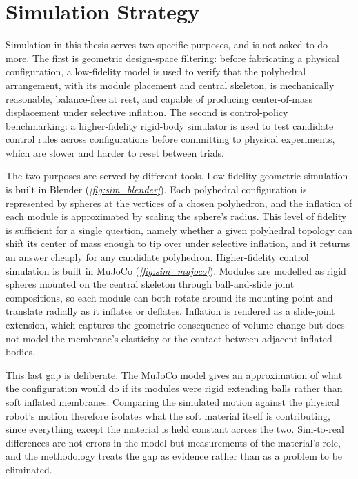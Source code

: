 \section{Simulation Strategy}
\label{sec:simulation-strategy}

Simulation in this thesis serves two specific purposes, and is not asked to do more. The first is geometric design-space filtering: before fabricating a physical configuration, a low-fidelity model is used to verify that the polyhedral arrangement, with its module placement and central skeleton, is mechanically reasonable, balance-free at rest, and capable of producing center-of-mass displacement under selective inflation. The second is control-policy benchmarking: a higher-fidelity rigid-body simulator is used to test candidate control rules across configurations before committing to physical experiments, which are slower and harder to reset between trials.

The two purposes are served by different tools. Low-fidelity geometric simulation is built in Blender (\textit{\cref{fig:sim_blender}}). Each polyhedral configuration is represented by spheres at the vertices of a chosen polyhedron, and the inflation of each module is approximated by scaling the sphere's radius. This level of fidelity is sufficient for a single question, namely whether a given polyhedral topology can shift its center of mass enough to tip over under selective inflation, and it returns an answer cheaply for any candidate polyhedron. Higher-fidelity control simulation is built in MuJoCo (\textit{\cref{fig:sim_mujoco}}). Modules are modelled as rigid spheres mounted on the central skeleton through ball-and-slide joint compositions, so each module can both rotate around its mounting point and translate radially as it inflates or deflates. Inflation is rendered as a slide-joint extension, which captures the geometric consequence of volume change but does not model the membrane's elasticity or the contact between adjacent inflated bodies.

This last gap is deliberate. The MuJoCo model gives an approximation of what the configuration would do if its modules were rigid extending balls rather than soft inflated membranes. Comparing the simulated motion against the physical robot's motion therefore isolates what the soft material itself is contributing, since everything except the material is held constant across the two. Sim-to-real differences are not errors in the model but measurements of the material's role, and the methodology treats the gap as evidence rather than as a problem to be eliminated.
